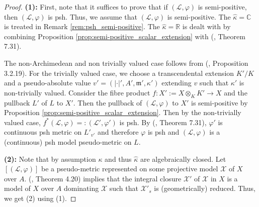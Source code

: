 \documentclass [11pt,reqno]{amsart}
\def\bC{{\mathbb{C}}}
\def\bR{{\mathbb{R}}}
\newcommand{\1}{\mathmybb{1}}
\def\cL{{\mathcal{L}}}
\def\cX{{\mathcal{X}}}
\def\m{\mathfrak m}
\begin{document}
\begin{proof}
\textbf{(1):} First, note that it suffices to prove that if $(\cL,\varphi)$ is semi-positive, then $(\cL,\varphi)$ is psh. Thus, we assume that $(\cL,\varphi)$ is semi-positive. The $\widehat{\kappa}=\bC$ is treated in Remark \ref{rem:psh_semi-positive}. The $\widehat{\kappa}=\bR$ is dealt with by combining Proposition \ref{prop:semi-positive_scalar_extension} with (\cite{BoucksomEriksson}, Theorem 7.31).

The non-Archimedean and non trivially valued case follows from (\cite{ChenMori21}, Proposition 3.2.19). For the trivially valued case, we choose a transcendental extension $K'/K$ and a pseudo-absolute value $v'=(|\cdot|',A',\m',\kappa')$ extending $v$ such that $\kappa'$ is non-trivially valued. Consider the fibre product $f:X':=X \otimes_{K} K' \to X$ and the pullback $L'$ of $L$ to $X'$. Then the pullback of $(\cL,\varphi)$ to $X'$ is semi-positive by Proposition \ref{prop:semi-positive_scalar_extension}. Then by the non-trivially valued case, $f^{\ast}(\cL,\varphi)=:(\cL',\varphi')$ is psh. By (\cite{BoucksomEriksson}, Theorem 7.31), $\varphi'$ is continuous psh metric on $L'_{v'}$ and therefore $\varphi$ is psh and $(\cL,\varphi)$ is a (continuous) psh model pseudo-metric on $L$.

\textbf{(2):} Note that by assumption $\kappa$ and thus $\widehat{\kappa}$ are algebraically closed. Let $[(\cL,\varphi)]$ be a pseudo-metric represented on some projective model $\cX$ of $X$ over $A$. (\cite{BoucksomEriksson}, Theorem 4.20) implies that the integral closure $\cX'$ of $\cX$ in $X$ is a model of $X$ over $A$ dominating $\cX$ such that $\cX'_{s}$ is (geometrically) reduced. Thus, we get (2) using (1). 
\end{proof}
\end{document}
